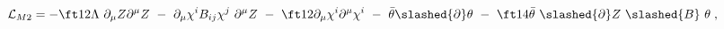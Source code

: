 \begin{equation}\label{newM2}
\mathcal{L}_{M2}=-\ft12 \Lambda\  \partial_\mu Z \partial^\mu Z 
\ - \  \partial_\mu \chi^i B_{ij} \chi^j\  \partial^\mu Z 
\ - \ \ft12 \partial_\mu \chi^i \partial^\mu  \chi^i 
\ - \ \bar{\theta}\slashed{\partial} \theta 
\ -\ \ft14 \bar{\theta} \ \slashed{\partial}Z \ \slashed{B} \ \theta \; ,
\end{equation}

